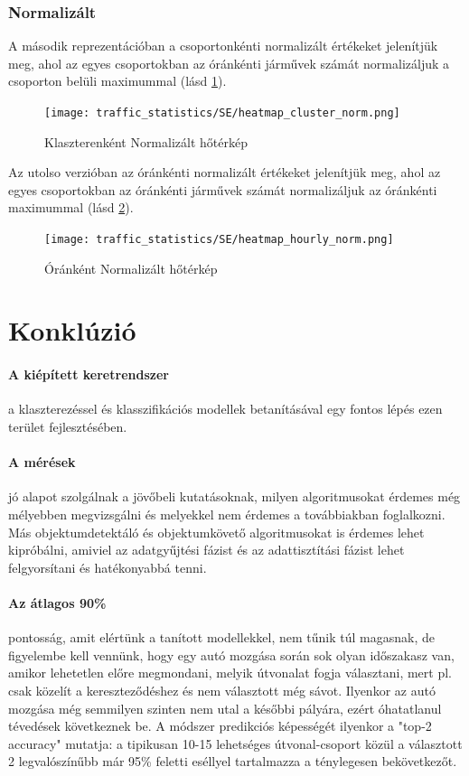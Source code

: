 \documentclass[12pt,a4paper]{article}
\begin{document}
\subsubsection*{Normalizált}
A második reprezentációban a csoportonkénti normalizált értékeket jelenítjük meg, ahol az egyes csoportokban az óránkénti járművek számát normalizáljuk a csoporton belüli maximummal (lásd \ref{fig:heatmapnorm_cluster}).
\begin{figure}[H]
    \centering
    \texttt{[image: traffic\_statistics/SE/heatmap\_cluster\_norm.png]}
    \caption{Klaszterenként Normalizált hőtérkép}
    \label{fig:heatmapnorm_cluster}
\end{figure}
Az utolso verzióban az óránkénti normalizált értékeket jelenítjük meg, ahol az egyes csoportokban az óránkénti járművek számát normalizáljuk az óránkénti maximummal (lásd \ref{fig:heatmapnorm_hourly}).
\begin{figure}[H]
    \centering
    \texttt{[image: traffic\_statistics/SE/heatmap\_hourly\_norm.png]}
    \caption{Óránként Normalizált hőtérkép}
    \label{fig:heatmapnorm_hourly}
\end{figure}

\newpage
\section{Konklúzió}
\paragraph{A kiépített keretrendszer} a klaszterezéssel és klasszifikációs modellek betanításával egy fontos lépés ezen terület fejlesztésében.
\paragraph{A mérések} jó alapot szolgálnak a jövőbeli kutatásoknak, milyen algoritmusokat érdemes még mélyebben megvizsgálni és melyekkel nem érdemes a továbbiakban foglalkozni. Más objektumdetektáló és objektumkövető algoritmusokat is érdemes lehet kipróbálni, amiviel az adatgyűjtési fázist és az adattisztítási fázist lehet felgyorsítani és hatékonyabbá tenni.
\paragraph{Az átlagos 90\%} pontosság, amit elértünk a tanított modellekkel, nem tűnik túl magasnak, de figyelembe kell vennünk, hogy egy autó mozgása során sok olyan időszakasz van, amikor lehetetlen előre megmondani, melyik útvonalat fogja választani, mert pl. csak közelít a kereszteződéshez és nem választott még sávot. Ilyenkor az autó mozgása még semmilyen szinten nem utal a későbbi pályára, ezért óhatatlanul tévedések következnek be. A módszer predikciós képességét ilyenkor a "top-2 accuracy" mutatja: a tipikusan 10-15 lehetséges útvonal-csoport közül a választott 2 legvalószínűbb már 95\% feletti eséllyel tartalmazza a ténylegesen bekövetkezőt.
\end{document}
